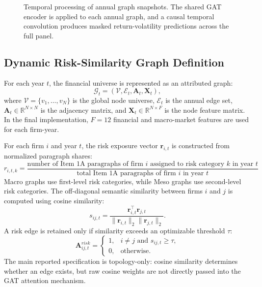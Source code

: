 \documentclass[11pt, a4paper]{article}
\begin{document}
\begin{figure}[H]
{
}
\caption[Temporal graph snapshot processing]{Temporal processing of annual graph snapshots. The shared GAT encoder is applied to each annual graph, and a causal temporal convolution produces masked return-volatility predictions across the full panel.}
\label{fig:temporal_snapshot_architecture}
\end{figure}

\subsection{Dynamic Risk-Similarity Graph Definition}
For each year $t$, the financial universe is represented as an attributed graph:
\begin{equation}
\mathcal{G}_{t} = (\mathcal{V}, \mathcal{E}_{t}, \mathbf{A}_{t}, \mathbf{X}_{t}),
\end{equation}
where $\mathcal{V}=\{v_{1},\ldots,v_{N}\}$ is the global node universe, $\mathcal{E}_{t}$ is the annual edge set, $\mathbf{A}_{t}\in\mathbb{R}^{N\times N}$ is the adjacency matrix, and $\mathbf{X}_{t}\in\mathbb{R}^{N\times F}$ is the node feature matrix. In the final implementation, $F=12$ financial and macro-market features are used for each firm-year.

For each firm $i$ and year $t$, the risk exposure vector $\mathbf{r}_{i,t}$ is constructed from normalized paragraph shares:
\begin{equation}
r_{i,t,k} = \frac{\text{number of Item 1A paragraphs of firm } i \text{ assigned to risk category } k \text{ in year } t}{\text{total Item 1A paragraphs of firm } i \text{ in year } t}
\end{equation}
Macro graphs use first-level risk categories, while Meso graphs use second-level risk categories. The off-diagonal semantic similarity between firms $i$ and $j$ is computed using cosine similarity:
\begin{equation}
s_{ij,t} = \frac{\mathbf{r}_{i,t}^{\top}\mathbf{r}_{j,t}}{\|\mathbf{r}_{i,t}\|_{2}\|\mathbf{r}_{j,t}\|_{2}}.
\end{equation}
A risk edge is retained only if similarity exceeds an optimizable threshold $\tau$:
\begin{equation}
\mathbf{A}_{ij,t}^{risk} =
\begin{cases}
1, & i\ne j \text{ and } s_{ij,t}\ge\tau,\\
0, & \text{otherwise}.
\end{cases}
\end{equation}
The main reported specification is topology-only: cosine similarity determines whether an edge exists, but raw cosine weights are not directly passed into the GAT attention mechanism.
\end{document}
